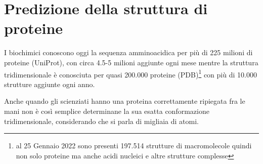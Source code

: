 \chapter{Predizione della struttura di proteine}

I biochimici conoscono oggi la sequenza amminoacidica per più di 225 milioni di proteine\supercite{proteienDBentries} (UniProt), con circa 4.5-5 milioni aggiunte ogni mese mentre la struttura tridimensionale è conosciuta per quasi 200.000 proteine\supercite{proteienDBentries} (PDB)\footnote{al 25 Gennaio 2022 sono presenti 197.514 strutture di macromolecole quindi non solo proteine ma anche acidi nucleici e altre strutture complesse\supercite{pdbStats}} con più di 10.000 strutture aggiunte ogni anno.

Anche quando gli scienziati hanno una proteina correttamente ripiegata fra le mani non è così semplice determinane la sua esatta conformazione tridimensionale, considerando che si parla di migliaia di atomi.



\clearpage